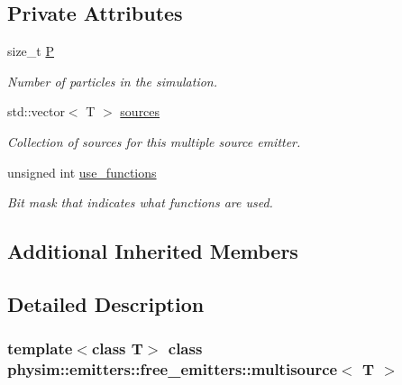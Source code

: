 \subsection*{Private Attributes}
\begin{DoxyCompactItemize}
\item 
\mbox{\label{classphysim_1_1emitters_1_1free__emitters_1_1multisource_a5d7da0aee3013d8b0f498d75b6bf2e8c}} 
size\+\_\+t \hyperlink{classphysim_1_1emitters_1_1free__emitters_1_1multisource_a5d7da0aee3013d8b0f498d75b6bf2e8c}{P}
\begin{DoxyCompactList}\small\item\em Number of particles in the simulation. \end{DoxyCompactList}\item 
\mbox{\label{classphysim_1_1emitters_1_1free__emitters_1_1multisource_af6304e14f12572ab5b768b0d5ec54d35}} 
std\+::vector$<$ T $>$ \hyperlink{classphysim_1_1emitters_1_1free__emitters_1_1multisource_af6304e14f12572ab5b768b0d5ec54d35}{sources}
\begin{DoxyCompactList}\small\item\em Collection of sources for this multiple source emitter. \end{DoxyCompactList}\item 
unsigned int \hyperlink{classphysim_1_1emitters_1_1free__emitters_1_1multisource_a99bad5ac0fb5cb14652bbfd0c1f0eeff}{use\+\_\+functions}
\begin{DoxyCompactList}\small\item\em Bit mask that indicates what functions are used. \end{DoxyCompactList}\end{DoxyCompactItemize}
\subsection*{Additional Inherited Members}


\subsection{Detailed Description}
\subsubsection*{template$<$class T$>$\newline
class physim\+::emitters\+::free\+\_\+emitters\+::multisource$<$ T $>$}

